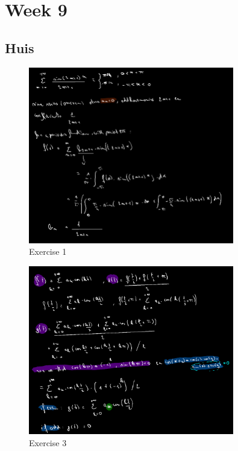 \documentclass[a4paper]{report}
\begin{document}






\section{Week 9}

\subsection{Huis}

\begin{figure}[H]
	\centering
	\includegraphics[width=0.8\textwidth]{assets/huis_9_ex_1.png}
	\caption{Exercise 1}
	\label{fig:huis_9_ex_1}
\end{figure}





\begin{figure}[H]
	\centering
	\includegraphics[width=0.8\textwidth]{assets/huis_9_ex_3.png}
	\caption{Exercise 3}
	\label{fig:huis_9_ex_3}
\end{figure}
\end{document}
